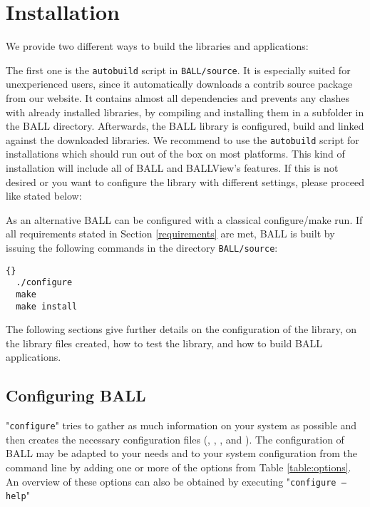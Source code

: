 \section{Installation}
\label{section:building-ball}

We provide two different ways to build the libraries and applications:

The first one is the {\tt autobuild} script in {\tt BALL/source}. It is
especially suited for unexperienced users, since it automatically downloads a
contrib source package from our website. It contains almost all dependencies
and prevents any clashes with already installed libraries, by compiling and
installing them in a subfolder in the BALL directory. Afterwards, the BALL
library is configured, build and linked against the downloaded libraries. We
recommend to use the {\tt autobuild} script for installations which should run
out of the box on most platforms. This kind of installation will include all of
BALL and BALLView's features. If this is not desired or you want to configure
the library with different settings, please proceed like stated below:

As an alternative BALL can be configured with a classical configure/make
run. If all requirements stated in Section \ref{requirements} are met, BALL is
built by issuing the following commands in the directory {\tt BALL/source}:

\begin{lstlisting}{}
  ./configure
  make
  make install
\end{lstlisting}

The following sections give further details on the configuration of the library,
on the library files created, how to test the library, and how to build BALL 
applications.

\subsection{Configuring BALL}

"{\tt configure}" tries to gather as much information on your system as possible and 
then creates the necessary configuration files (,
, , and ).
The configuration of BALL may be adapted to your needs and to your system
configuration from the command line by adding one or more of the options from
Table \ref{table:options}.
An overview of these options can also be obtained by executing "{\tt configure
--help}"

